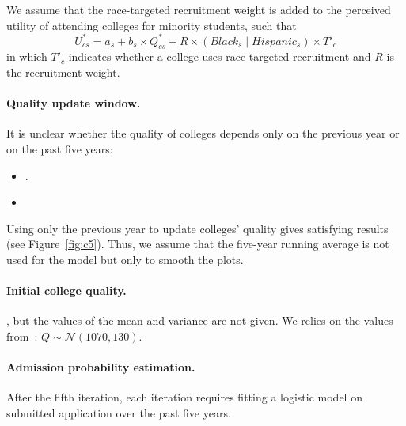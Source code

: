 We assume that the race-targeted recruitment weight is added to the perceived utility of attending colleges for minority students, such that \[ U^*_{cs} = a_s + b_s \times Q^*_{cs} + R \times (Black_s \mid Hispanic_s ) \times {T'}_c \] in which ${T'}_c$ indicates whether a college uses race-targeted recruitment and $R$ is the recruitment weight.

\paragraph{Quality update window.}

It is unclear whether the quality of colleges depends only on the previous year or on the past five years:

\begin{itemize}

\item{}.

\item{}

\end{itemize}

Using only the previous year to update colleges' quality gives satisfying results (see Figure~\ref{fig:c5}). 
Thus, we assume that the five-year running average is not used for the model but only to smooth the plots.

\paragraph{Initial college quality.}

, but the values of the mean and variance are not given. 
We relies on the values from~\cite{reardon2016agent}: $Q \sim \mathcal{N}(1070, 130)$.

\paragraph{Admission probability estimation.}

After the fifth iteration, each iteration requires fitting a logistic model on submitted application over the past five years.

